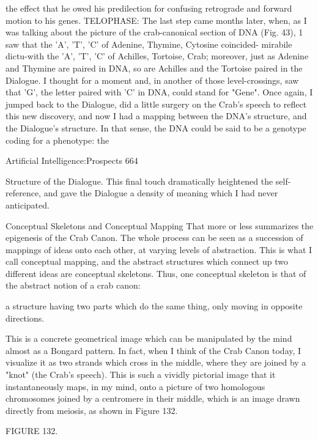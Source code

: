 the effect that he owed his predilection for confusing retrograde and forward motion to
his genes.
         TELOPHASE: The last step came months later, when, as I was talking about the
picture of the crab-canonical section of DNA (Fig. 43), 1 saw that the 'A', 'T', 'C' of
Adenine, Thymine, Cytosine coincided- mirabile dictu-with the 'A', 'T', 'C' of Achilles,
Tortoise, Crab; moreover, just as Adenine and Thymine are paired in DNA, so are
Achilles and the Tortoise paired in the Dialogue. I thought for a moment and, in another
of those level-crossings, saw that 'G', the letter paired with 'C' in DNA, could stand for
"Gene". Once again, I jumped back to the Dialogue, did a little surgery on the Crab's
speech to reflect this new discovery, and now I had a mapping between the DNA's
structure, and the Dialogue's structure. In that sense, the DNA could be said to be a
genotype coding for a phenotype: the




Artificial Intelligence:Prospects                                                        664

Structure of the Dialogue. This final touch dramatically heightened the self-reference,
and gave the Dialogue a density of meaning which I had never anticipated.

               Conceptual Skeletons and Conceptual Mapping
That more or less summarizes the epigenesis of the Crab Canon. The whole process can
be seen as a succession of mappings of ideas onto each other, at varying levels of
abstraction. This is what I call conceptual mapping, and the abstract structures which
connect up two different ideas are conceptual skeletons. Thus, one conceptual skeleton is
that of the abstract notion of a crab canon:

                  a structure having two parts which do the same thing,
                            only moving in opposite directions.

       This is a concrete geometrical image which can be manipulated by the mind
almost as a Bongard pattern. In fact, when I think of the Crab Canon today, I visualize it
as two strands which cross in the middle, where they are joined by a "knot" (the Crab's
speech). This is such a vividly pictorial image that it instantaneously maps, in my mind,
onto a picture of two homologous chromosomes joined by a centromere in their middle,
which is an image drawn directly from meiosis, as shown in Figure 132.




                                       FIGURE 132.

